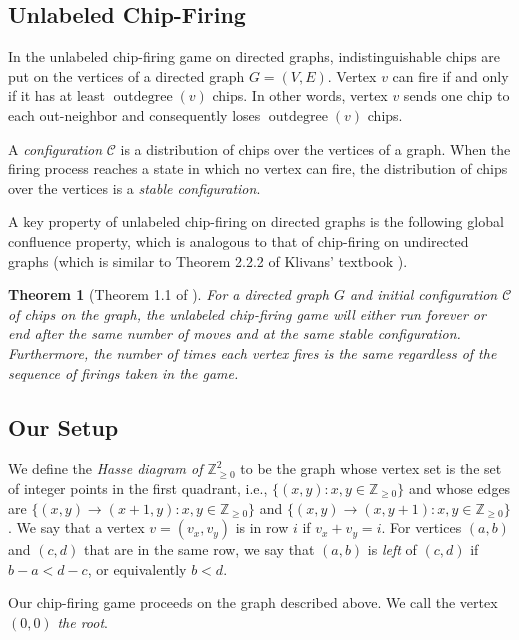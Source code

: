 \documentclass[11pt]{article}
\newtheorem{theorem}{Theorem}[section] %
\theoremstyle{definition}
\theoremstyle{remark}
\DeclareMathOperator{\outdeg}{outdegree}
\begin{document}
\subsection{Unlabeled Chip-Firing}

In the unlabeled chip-firing game on directed graphs, indistinguishable chips are put on the vertices of a directed graph $G = (V, E)$. Vertex $v$ can fire if and only if it has at least $\outdeg(v)$ chips. In other words, vertex $v$ sends one chip to each out-neighbor and consequently loses $\outdeg(v)$ chips.

A \textit{configuration} $\mathcal{C}$ is a distribution of chips over the vertices of a graph. When the firing process reaches a state in which no vertex can fire, the distribution of chips over the vertices is a \textit{stable configuration}.

A key property of unlabeled chip-firing on directed graphs is the following global confluence property, which is analogous to that of chip-firing on undirected graphs (which is similar to Theorem 2.2.2 of Klivans' 
 textbook \cite{klivans2018mathematics}).

\begin{theorem}[Theorem 1.1 of \cite{MR1203679}]\label{thm:confluence}
For a directed graph $G$ and initial configuration $\mathcal{C}$ of chips on the graph, the unlabeled chip-firing game will either run forever or end after the same number of moves and at the same stable configuration. Furthermore, the number of times each vertex fires is the same regardless of the sequence of firings taken in the game.
\end{theorem}



\subsection{Our Setup}

We define the \textit{Hasse diagram of $\mathbb{Z}_{\geq 0}^2$} to be the graph whose vertex set is the set of integer points in the first quadrant, i.e., $\{(x, y): x, y \in \mathbb{Z}_{\geq 0}\}$ and whose edges are $\{(x, y) \to (x+1, y): x, y \in \mathbb{Z}_{\geq 0}\}$ and $\{(x, y) \to (x, y+1): x, y \in \mathbb{Z}_{\geq 0}\}$. We say that a vertex $v = (v_x, v_y)$ is in row $i$ if $v_x+v_y=i$. For vertices  $(a, b)$ and $(c, d)$ that are in the same row, we say that $(a, b)$ is \textit{left} of $(c, d)$ if $b-a < d-c$, or equivalently $b < d$.

Our chip-firing game proceeds on the graph described above. We call the vertex $(0,0)$ \textit{the root}.
\end{document}
